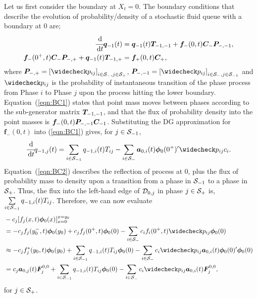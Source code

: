Let us first consider the boundary at \( X_t=0\). The boundary conditions that describe the evolution of probability/density of a stochastic fluid queue with a boundary at \(0\) are;
\begin{align}\label{eqn:BC1}
\cfrac{\, \mathrm{d}}{\, \mathrm{d} t}\boldsymbol q_{-1}(t) &= \boldsymbol q_{-1}(t) \boldsymbol T_{{-1},{-1}} + \boldsymbol f_-(0,t)\boldsymbol C_-\boldsymbol P_{-,{-1}},
\\\label{eqn:BC2}
\boldsymbol f_-(0^+,t)\boldsymbol C_-\boldsymbol P_{-,+} + \boldsymbol q_{-1}(t)\boldsymbol T_{{-1},+}&=\boldsymbol f_+(0,t)\boldsymbol C_+,
\end{align}
where \(\bs P_{-,+} = \left[\widecheck p_{ij}\right]_{i\in\calS_-,j\in\calS_{+}}\), \(\bs P_{-,{-1}} = \left[\widecheck p_{ij}\right]_{i\in\calS_-,j\in\calS_{-1}}\) and \(\widecheck p_{ij}\) is the probability of instantaneous transition of the phase process from Phase \(i\) to Phase \(j\) upon the process hitting the lower boundary. Equation~(\ref{eqn:BC1}) states that point mass moves between phases according to the sub-generator matrix \(\boldsymbol T_{{-1},{-1}}\), and that the flux of probability density into the point masses is \(\boldsymbol f_-(0,t)\boldsymbol P_{-,{-1}}\boldsymbol C_{-1}\). Substituting the DG approximation for \(\boldsymbol f_-(0,t)\) into (\ref{eqn:BC1}) gives, for \(j\in\mathcal{S}_{-1}\), 
\begin{equation*}\label{eqn:DGBC1}
\cfrac{\wrt}{\wrt t} q_{{-1},j}(t) = \sum_{i\in\calS_{-1}} q_{{-1},i}(t) T_{i j} - \sum_{i\in\calS_-}\boldsymbol a_{0,i}(t)\boldsymbol \phi_0(0^+)\tr{}\widecheck p_{ij} c_i.
\end{equation*}
Equation~(\ref{eqn:BC2}) describes the reflection of process at \(0\), plus the flux of probability mass to density upon a transition from a phase in \(\mathcal{S}_{-1}\) to a phase in \(\mathcal{S}_+\). Thus, the flux into the left-hand edge of \(\mathcal{D}_{0,j}\) in phase \(j\in\mathcal{S}_+\) is, \(\sum\limits_{i\in\mathcal{S}_{-1}} q_{{-1},i}(t)T_{ij}\). Therefore, we can now evaluate 
\begin{align*}
	&-c_j[f_j(x,t)\boldsymbol\phi_0(x)]_{x=0}^{x=y_{0}} 
	\\& =  -c_jf_j(y_0^-,t)\boldsymbol\phi_0(y_0)+c_jf_j(0^+,t)\boldsymbol\phi_0(0) - \sum_{i\in\calS_-}c_if_i(0^+,t)\widecheck p_{ij}\bs \phi_0(0)
	\\& \approx -c_j f_j^*(y_0,t)\boldsymbol\phi_0(y_0)+\sum_{i\in\calS_{-1}}q_{{-1},i}(t)T_{ij}\boldsymbol\phi_0(0) - \sum_{i\in\calS_-}c_i\widecheck p_{ij}\bs a_{0,i}(t)\bs \phi_0(0)\tr{}\bs \phi_0(0)
	\\& = c_j\boldsymbol a_{0,j}(t)\bs F_j^{0,0}+\sum_{i\in\calS_{-1}}q_{{-1},i}(t)T_{ij}\boldsymbol\phi_0(0) - \sum_{i\in\calS_-}c_i\widecheck p_{ij}\bs a_{0,i}(t)\bs F_j^{0,0},
\end{align*}
for \(j \in \mathcal{S}_+\). 

